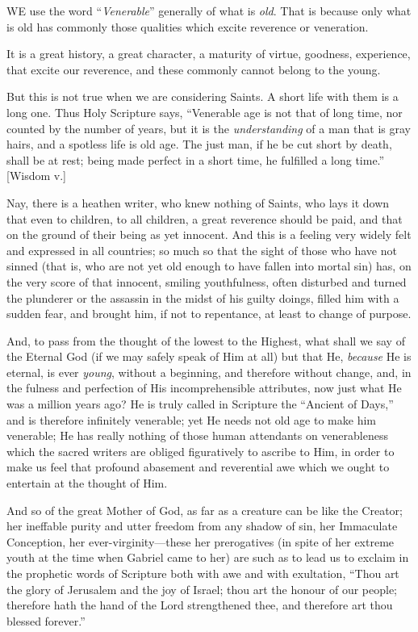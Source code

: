 WE
use the word ``\emph{Venerable}'' generally of what is \emph{old}. That is
because only what is old has commonly those qualities which excite
reverence or veneration.

It is a great history, a great
character, a maturity of virtue, goodness, experience, that excite our
reverence, and these commonly cannot belong to the young.

But this is not true when we are
considering Saints. A short life with them is a long one. Thus Holy
Scripture says, ``Venerable age is not that of long time, nor counted by
the number of years, but it is the \emph{understanding} of a man that is
gray hairs, and a spotless life is old age. The just man, if he be cut
short by death, shall be at rest; being made perfect in a short time, he
fulfilled a long time.'' [Wisdom v.]

Nay, there is a heathen writer,
who knew nothing of Saints, who lays it down that even to children, to
all children, a great reverence should be paid, and that on the
ground of their being as yet innocent. And this is a feeling very widely
felt and expressed in all countries; so much so that the sight of those
who have not sinned (that is, who are not yet old enough to have fallen
into mortal sin) has, on the very score of that innocent, smiling
youthfulness, often disturbed and turned the plunderer or the assassin
in the midst of his guilty doings, filled him with a sudden fear, and
brought him, if not to repentance, at least to change of purpose.

And, to pass from the thought of
the lowest to the Highest, what shall we say of the Eternal God (if we
may safely speak of Him at all) but that He, \emph{because} He is
eternal, is ever \emph{young}, without a beginning, and therefore
without change, and, in the fulness and perfection of His
incomprehensible attributes, now just what He was a million years ago?
He is truly called in Scripture the ``Ancient of Days,'' and is therefore
infinitely venerable; yet He needs not old age to make him venerable; He
has really nothing of those human attendants on venerableness which the
sacred writers are obliged figuratively to ascribe to Him, in order to
make us feel that profound abasement and reverential awe which we ought
to entertain at the thought of Him.

And so of the great Mother of
God, as far as a creature can be like the Creator; her ineffable purity
and utter freedom from any shadow of sin, her Immaculate Conception, her
ever-virginity—these her prerogatives (in spite of her extreme youth
at the time when Gabriel came to her) are such as to lead us to exclaim
in the prophetic words of Scripture both with awe and with
exultation, ``Thou art the glory of Jerusalem and the joy of Israel; thou
art the honour of our people; therefore hath the hand of the Lord
strengthened thee, and therefore art thou blessed forever.''

